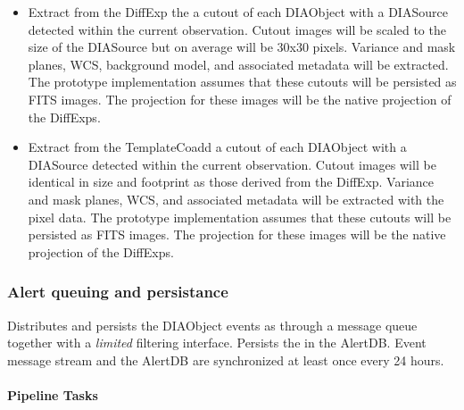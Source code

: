  \begin{itemize}
\item Extract from the DiffExp the a cutout of each DIAObject with a DIASource detected within the current observation.  Cutout images will be scaled to the size of the DIASource but on average will be 30x30 pixels. Variance and mask planes, WCS, background model, and associated metadata will be extracted. The prototype implementation assumes that these cutouts will be persisted as FITS images. The projection for these images will be the native projection of the DiffExps.

\item Extract from the TemplateCoadd  a cutout of each DIAObject with a DIASource detected within the current observation.  Cutout images will be identical in size and footprint as those derived from the DiffExp. Variance and mask planes, WCS, and associated metadata will be extracted with the pixel data. The prototype implementation assumes that these cutouts will be persisted as FITS images. The projection for these images will be the native projection of the DiffExps.
\end{itemize}

\subsubsection{Alert queuing and persistance}
\label{sec:apQueue}
Distributes and persists the DIAObject events as \VOEvents through a message queue together with a {\it limited} filtering interface. Persists the \VOEvents in the AlertDB. Event message stream and the AlertDB are synchronized at least once every 24 hours.


\paragraph{Pipeline Tasks}

